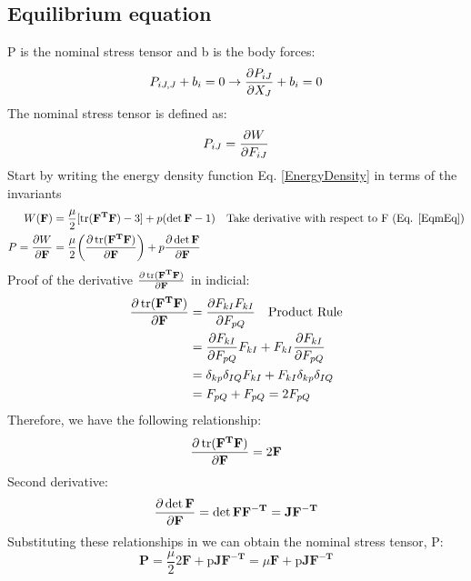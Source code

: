 \documentclass[12pt,3p]{article}
\begin{document}
\subsection{Equilibrium equation}
P is the nominal stress tensor and b is the body forces: 
\begin{equation}\label{EqmEq}
P_{iJ,J} + b_i = 0 \rightarrow \pdv{P_{iJ}}{X_J} + b_i = 0 
\end{equation}
The nominal stress tensor is defined as: 
\begin{equation}\label{PW}
P_{iJ} = \pdv{W}{F_{iJ}}
\end{equation}
Start by writing the energy density function Eq. \ref{EnergyDensity} in terms of the invariants
\begin{align*}
W(\mathbf{F}) &= \frac{\mu}{2}  [ \trace(\mathbf{F^T} \mathbf{F}) - 3 ] + p (\det \mathbf{F} - 1) \quad \text{Take derivative with respect to F (Eq. \ref{EqmEq})} \\
P = \pdv{W}{\mathbf{F}} &= \frac{\mu}{2}  \bigg( \pdv{\trace(\mathbf{F^T} \mathbf{F})}{\mathbf{F}} \bigg) + p \pdv{\det \mathbf{F} }{\mathbf{F}}
\end{align*}
Proof of the derivative $\pdv{\trace(\mathbf{F^T} \mathbf{F})}{\mathbf{F}}$ in indicial: 
\begin{align*}
\pdv{\trace(\mathbf{F^T} \mathbf{F})}{\mathbf{F}} &= \pdv{F_{kI} F_{kI}}{F_{pQ}} \quad \text{Product Rule}\\ 
									&= \pdv{F_{kI}}{F_{pQ}} F_{kI} + F_{kI} \pdv{F_{kI}}{F_{pQ}} \\
									&= \delta_{kp} \delta_{IQ} F_{kI} + F_{kI} \delta_{kp} \delta_{IQ} \\
									&= F_{pQ} + F_{pQ} = 2 F_{pQ}
\end{align*}
Therefore, we have the following relationship: 
\begin{equation}\label{proof1}
\pdv{\trace(\mathbf{F^T} \mathbf{F})}{\mathbf{F}} = 2 \mathbf{F}
\end{equation}
Second derivative: 
\begin{align*}
\pdv{\det \mathbf{F} }{\mathbf{F}} = \det \mathbf{F} \mathbf{F^{-T}} = \mathbf{J} \mathbf{F^{-T}}
\end{align*}
Substituting these relationships in we can obtain the nominal stress tensor, P: 
\begin{equation}\label{P}
\mathbf{P} = \frac{\mu}{2}  2 \mathbf{F} + \text{p} \mathbf{J} \mathbf{F^{-T}} = \mu \mathbf{F} + \text{p} \mathbf{J} \mathbf{F^{-T}}
\end{equation}
\end{document}
